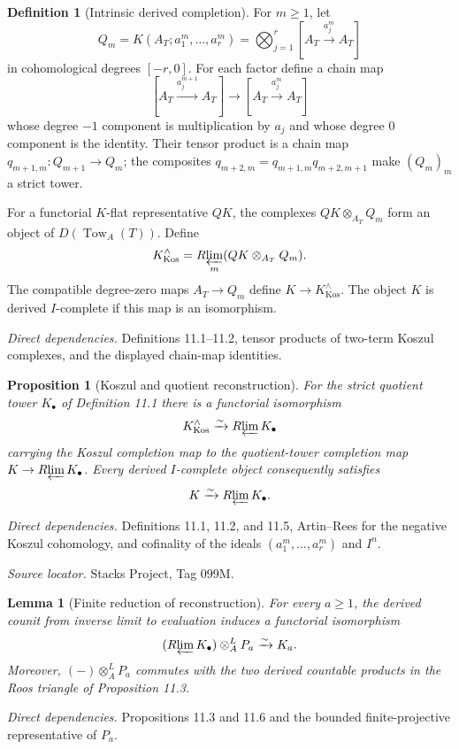 \documentclass[10pt]{article}
\newtheorem{proposition}[theorem]{Proposition}
\newtheorem{lemma}[theorem]{Lemma}
\theoremstyle{definition}
\newtheorem{definition}[theorem]{Definition}
\newcommand{\Rlim}{R\!\varprojlim}
\newcommand{\deps}[1]{\par\smallskip\textit{Direct dependencies.} #1\par}
\newcommand{\sources}[1]{\par\textit{Source locator.} #1\par}
\begin{document}
\begin{definition}[Intrinsic derived completion]
For $m\geq1$, let
\[
 Q_m=K(A_T;a_1^m,\dots,a_r^m)
   =\bigotimes_{j=1}^r[A_T\xrightarrow{a_j^m}A_T]
\]
in cohomological degrees $[-r,0]$.  For each factor define a chain map
\[
 [A_T\xrightarrow{a_j^{m+1}}A_T]
 \longrightarrow[A_T\xrightarrow{a_j^m}A_T]
\]
whose degree $-1$ component is multiplication by $a_j$ and whose degree
$0$ component is the identity.  Their tensor product is a chain map
$q_{m+1,m}:Q_{m+1}\to Q_m$; the composites
$q_{m+2,m}=q_{m+1,m}q_{m+2,m+1}$ make $(Q_m)_m$ a strict tower.

For a functorial $K$-flat representative $QK$, the complexes
$QK\otimes_{A_T}Q_m$ form an object of
$D(\operatorname{Tow}_{A}(T))$.  Define
\[
 K^{\wedge}_{\mathrm{Kos}}
   =\Rlim_m(QK\otimes_{A_T}Q_m).
\]
The compatible degree-zero maps $A_T\to Q_m$ define
$K\to K^{\wedge}_{\mathrm{Kos}}$.  The object $K$ is derived
$I$-complete if this map is an isomorphism.
\end{definition}
\deps{Definitions 11.1--11.2, tensor products of two-term Koszul
complexes, and the displayed chain-map identities.}

\begin{proposition}[Koszul and quotient reconstruction]
For the strict quotient tower $K_\bullet$ of Definition 11.1 there is a
functorial isomorphism
\[
 K^{\wedge}_{\mathrm{Kos}}\xrightarrow{\sim}\Rlim K_\bullet
\]
carrying the Koszul completion map to the quotient-tower completion map
$K\to\Rlim K_\bullet$.  Every derived $I$-complete object consequently
satisfies
\[
 K\xrightarrow{\sim}\Rlim K_\bullet.
\]
\end{proposition}
\deps{Definitions 11.1, 11.2, and 11.5, Artin--Rees for the negative
Koszul cohomology, and cofinality of the ideals
$(a_1^m,\dots,a_r^m)$ and $I^n$.}
\sources{Stacks Project, Tag 099M.}

\begin{lemma}[Finite reduction of reconstruction]
For every $a\geq1$, the derived counit from inverse limit to evaluation
induces a functorial isomorphism
\[
 (\Rlim K_\bullet)\otimes_A^LP_a\xrightarrow{\sim}K_a.
\]
Moreover, $(-)\otimes_A^LP_a$ commutes with the two derived countable
products in the Roos triangle of Proposition 11.3.
\end{lemma}
\deps{Propositions 11.3 and 11.6 and the bounded finite-projective
representative of $P_a$.}
\end{document}
